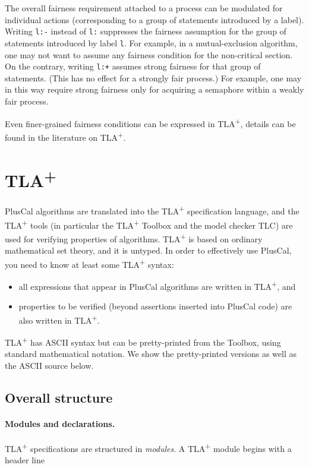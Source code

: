\documentclass[11pt,fleqn]{article}
\newcommand{\tlaplus}{TLA\textsuperscript{+}\xspace}
\begin{document}
The overall fairness requirement attached to a process can be modulated for
individual actions (corresponding to a group of statements introduced by a
label). Writing \verb|l:-| instead of \verb|l:| suppresses the fairness
assumption for the group of statements introduced by label \verb|l|. For
example, in a mutual-exclusion algorithm, one may not want to assume any
fairness condition for the non-critical section. On the contrary, writing
\verb|l:+| assumes strong fairness for that group of statements. (This has no
effect for a strongly fair process.) For example, one may in this way require
strong fairness only for acquiring a semaphore within a weakly fair process.

Even finer-grained fairness conditions can be expressed in \tlaplus, details can
be found in the literature on \tlaplus.



\section{\tlaplus}

PlusCal algorithms are translated into the \tlaplus specification language, and
the \tlaplus tools (in particular the \tlaplus Toolbox and the model checker
TLC) are used for verifying properties of algorithms. \tlaplus is based on
ordinary mathematical set theory, and it is untyped. In order to effectively use
PlusCal, you need to know at least some \tlaplus syntax:
\begin{itemize}
\item all expressions that appear in PlusCal algorithms are written in \tlaplus,
  and
\item properties to be verified (beyond assertions inserted into PlusCal code)
  are also written in \tlaplus.
\end{itemize}
\tlaplus has ASCII syntax but can be pretty-printed from the Toolbox, using
standard mathematical notation. We show the pretty-printed versions as well as
the ASCII source below.


\subsection{Overall structure}

\paragraph{Modules and declarations.}

\tlaplus specifications are structured in \emph{modules}. A \tlaplus module
begins with a header line
\end{document}
